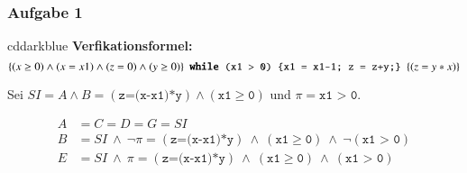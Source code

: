\documentclass[aspectratio=1610,onlymath, ngerman, handout]{beamer}
\renewcommand{\emph}[1]{\textbf{#1}}
\newcommand{\logand}{ \ \land \ }
\begin{document}
	\begin{frame} \frametitle{Aufgabe 1}
	\small
	
		\begin{doodle}{cddarkblue}
			\emph{Verfikationsformel:} \footnotesize
			\begin{equation*}
			\{ (x \ge 0) \land (x = x1) \land (z=0) \land (y \ge 0) \} \ \ \texttt{\emph{while} (x1 > 0) \{x1 = x1-1; z = z+y;\}} \ \ \{(z = y*x)\}
			\end{equation*}
		\end{doodle}
		
		\bigskip \pause
		
		Sei $SI = A \land B = (\texttt{z=(x-x1)*y}) \land (\texttt{x1} \ge \texttt{0})$ und $\pi = \texttt{x1 > 0}$.
		
		
			\begin{align*}
			A &= C = D = G = SI \\
			B &= SI \logand \lnot \pi = (\texttt{z=(x-x1)*y}) \logand (\texttt{x1} \ge \texttt{0}) \logand \lnot (\texttt{x1 > 0}) \\
			E &= SI \logand \pi = (\texttt{z=(x-x1)*y}) \logand (\texttt{x1} \ge \texttt{0}) \logand (\texttt{x1 > 0} )
			\end{align*}
	\end{frame}
\end{document}
